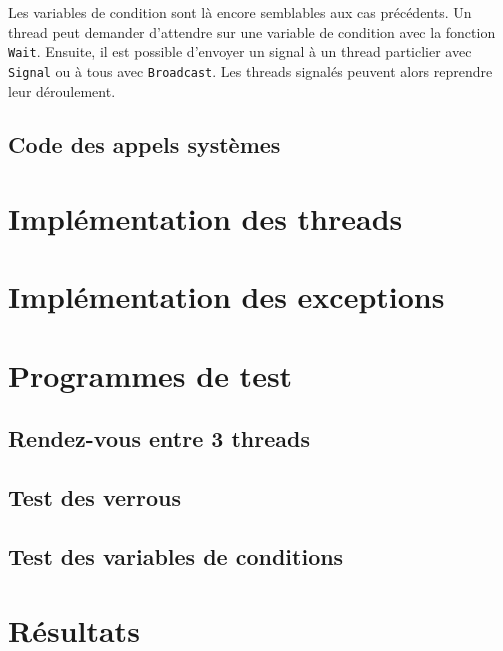\documentclass{article}
\def\fun#1{\texttt{#1}}
\begin{document}
  Les variables de condition sont là encore semblables aux cas précédents. Un thread peut demander d'attendre sur une variable de condition avec la fonction \fun{Wait}. Ensuite, il est possible d'envoyer un signal à un thread particlier avec \fun{Signal} ou à tous avec \fun{Broadcast}. Les threads signalés peuvent alors reprendre leur déroulement.

\subsection{Code des appels systèmes}

\section{Implémentation des threads}

\section{Implémentation des exceptions}

\section{Programmes de test}
\subsection{Rendez-vous entre 3 threads}
\subsection{Test des verrous}
\subsection{Test des variables de conditions}

\section{Résultats}
\end{document}
